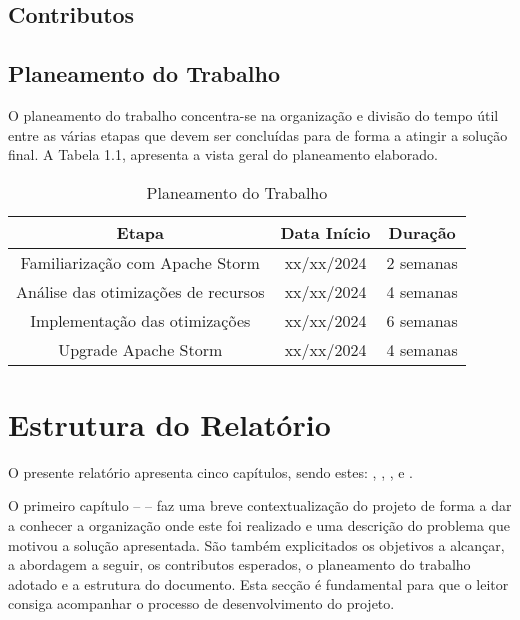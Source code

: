 \subsection{Contributos}



\subsection{Planeamento do Trabalho}

O planeamento do trabalho concentra-se na organização e divisão do tempo útil entre as 
várias etapas que devem ser concluídas para de forma a atingir a solução final. A Tabela 1.1, 
apresenta a vista geral do planeamento elaborado.

\begin{table}[H]
  \begin{center}
    \caption{Planeamento do Trabalho}
    \vspace{5mm}
    \label{tab:plan}
    \begin{tabular}{|c|c|c|}
      \hline
      \textbf{Etapa} & \textbf{Data Início} & \textbf{Duração} \\ \hline
      Familiarização com Apache Storm  & xx/xx/2024 & 2 semanas \\ \hline
      Análise das otimizações de recursos & xx/xx/2024 & 4 semanas \\ \hline
      Implementação das otimizações & xx/xx/2024 & 6 semanas \\ \hline
      Upgrade Apache Storm & xx/xx/2024 & 4 semanas \\ \hline
    \end{tabular}
  \end{center}
\end{table}

\section{Estrutura do Relatório}

O presente relatório apresenta cinco capítulos, sendo estes: , , 
,  e .

O primeiro capítulo –  – faz uma breve contextualização do projeto de forma a dar a
conhecer a organização onde este foi realizado e uma descrição do problema que motivou a solução apresentada. 
São também explicitados os objetivos a alcançar, a abordagem a seguir, os contributos esperados, o planeamento do 
trabalho adotado e a estrutura do documento. Esta secção é fundamental para que o leitor consiga acompanhar o
processo de desenvolvimento do projeto.

